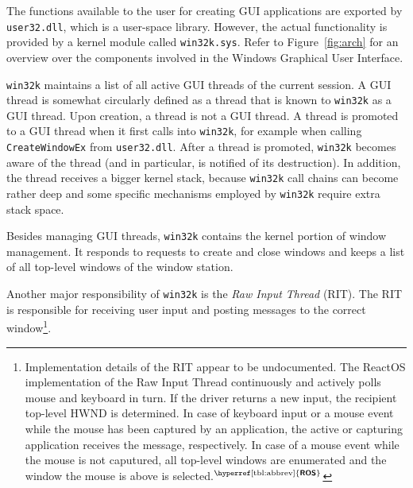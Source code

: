 \documentclass[10pt,twocolumn,a4paper]{article}
\newcommand{\bs}[1]{\textbf{\sffamily #1}}
\newcommand{\winver}[1]{$^{\text{\hyperref[tbl:abbrev]{\bs{#1}}}}$}
\begin{document}
		The functions available to the user for creating GUI applications are
		exported by \texttt{user32.dll}, which is a user-space library.
		However, the actual functionality is provided by a kernel module called
		\texttt{win32k.sys}. Refer to Figure~\ref{fig:arch} for an overview over the
		components involved in the Windows Graphical User Interface. \cite{probertwin32k}

		\texttt{win32k} maintains a list of all active GUI threads of the
		current session. A GUI thread is somewhat circularly defined as a
		thread that is known to \texttt{win32k} as a GUI thread. Upon creation,
		a thread is not a GUI thread. A thread is promoted to a GUI thread when
		it first calls into \texttt{win32k}, for example when calling
		\texttt{CreateWindowEx} from \texttt{user32.dll}. After a thread is
		promoted, \texttt{win32k} becomes aware of the thread (and in
		particular, is notified of its destruction). In addition, the thread
		receives a bigger kernel stack, because \texttt{win32k} call chains
		can become rather deep and some specific mechanisms employed by \texttt{win32k}
		require extra stack space.
		\cite{probertwin32k,mandy2011kernel}

		Besides managing GUI threads, \texttt{win32k} contains the kernel portion
		of window management. It responds to requests to create and close windows
		and keeps a list of all top-level windows of the window station.
		\cite{probertwin32k,goingdeep}

		Another major responsibility of \texttt{win32k} is the \textit{Raw Input
		Thread} (RIT). The RIT is responsible for receiving user input and posting
		messages to the correct window\footnote{Implementation details of the
		RIT appear to be undocumented. The ReactOS implementation of
		the Raw Input Thread continuously and actively polls mouse and keyboard
		in turn. If the driver returns a new input, the recipient top-level HWND
		is determined. In case of keyboard input or a mouse event while the mouse
		has been captured by an application, the active or capturing application
		receives the message, respectively. In case of a mouse event while the
		mouse is not caputured, all top-level windows are enumerated and the
		window the mouse is above is selected.\winver{ROS}}.
		\cite{probertwin32k}
\end{document}
